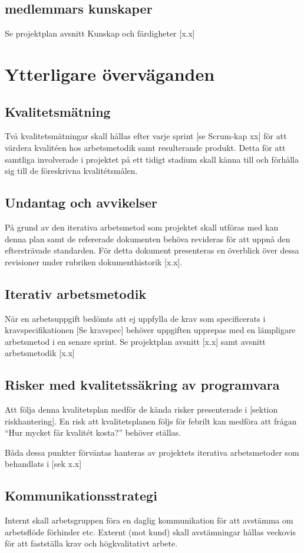 \documentclass[a4paper,10pt]{article}
\begin{document}
\subsection{medlemmars kunskaper}
Se projektplan avsnitt Kunskap och färdigheter [x.x]

\section{Ytterligare överväganden}

\subsection{Kvalitetsmätning}
Två kvalitetsmätningar skall hållas efter varje sprint [se Scrum-kap xx] för att värdera kvalitéen hos arbetsmetodik samt resulterande produkt. 
Detta för att samtliga involverade i  projektet på ett tidigt stadium skall känna till och förhålla sig till de föreskrivna kvalitétsmålen.

\subsection{Undantag och avvikelser}
På grund av den iterativa arbetsmetod som projektet skall utföras med kan denna plan samt de refererade dokumenten behöva revideras för att uppnå den eftersträvade standarden. För detta dokument presenteras en överblick över dessa revisioner under rubriken dokumenthistorik [x.x].

\subsection{Iterativ arbetsmetodik}
När en arbetsuppgift bedömts att ej uppfylla de krav som specificerats i kravspecifikationen [Se kravspec] behöver uppgiften upprepas med en lämpligare arbetsmetod i en senare sprint. Se projektplan avsnitt [x.x] samt avsnitt arbetsmetodik [x.x]

\subsection{Risker med kvalitetssäkring av programvara}
Att följa denna kvalitetsplan medför de kända risker presenterade i [sektion riskhantering].  En risk att kvalitetsplanen följs för febrilt kan medföra att frågan “Hur mycket får kvalitét kosta?” behöver ställas.

Båda dessa punkter förväntas hanteras av projektets iterativa arbetsmetoder som behandlats i [sek x.x]

\subsection{Kommunikationsstrategi}
Internt skall arbetsgruppen föra en daglig kommunikation för att avstämma om arbetsflöde förhinder etc.
Externt (mot kund) skall avstämningar hållas veckovis för att fastställa krav och högkvalitativt arbete.
\end{document}
